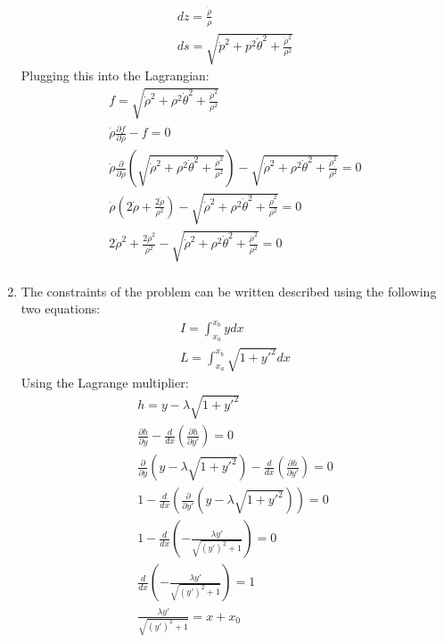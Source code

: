 \documentclass[12pt]{article}
\begin{document}
\begin{enumerate}
\begin{gather*}
            dz=\frac{\dot{\rho}}{\rho}\\
            ds=\sqrt{\dot{p}^2+p^2 \dot{\theta}^2+\frac{\dot{\rho}^2}{\rho^2}}
        \end{gather*}
        Plugging this into the Lagrangian:
        \begin{gather*}
            f=\sqrt{\dot{\rho}^2+\rho^2 \dot{\theta}^2+\frac{\dot{\rho}^2}{\rho^2}}\\
            \dot{\rho}\frac{\partial f}{\partial\dot{\rho}}-f=0\\
            \dot{\rho}\frac{\partial }{\partial\dot{\rho}}\left(\sqrt{\dot{\rho}^2+\rho^2 \dot{\theta}^2+\frac{\dot{\rho}^2}{\rho^2}}\right)-\sqrt{\dot{\rho}^2+\rho^2 \dot{\theta}^2+\frac{\dot{\rho}^2}{\rho^2}}=0\\
            \dot{\rho}\left(2\dot{\rho}+\frac{2\dot{\rho}}{\rho^2}\right)-\sqrt{\dot{\rho}^2+\rho^2 \dot{\theta}^2+\frac{\dot{\rho}^2}{\rho^2}}=0\\
            2\dot{\rho}^2+\frac{2\dot{\rho}^2}{\rho^2}-\sqrt{\dot{\rho}^2+\rho^2 \dot{\theta}^2+\frac{\dot{\rho}^2}{\rho^2}}=0\\
        \end{gather*}
        \item
        The constraints of the problem can be written described using the following two equations:
        \begin{gather*}
            I=\int_{x_a}^{x_b}ydx\\
            L=\int_{x_a}^{x_b}\sqrt{1+y'^2}dx
        \end{gather*}
        Using the Lagrange multiplier:
        \begin{gather*}
            h=y-\lambda\sqrt{1+y'^2}\\
            \frac{\partial h}{\partial y}-\frac{d}{dx}\left(\frac{\partial h}{\partial y'}\right)=0\\
            \frac{\partial}{\partial y}\left(y-\lambda\sqrt{1+y'^2}\right)-\frac{d}{dx}\left(\frac{\partial h}{\partial y'}\right)=0\\
            1-\frac{d}{dx}\left(\frac{\partial}{\partial y'}\left(y-\lambda\sqrt{1+y'^2}\right)\right)=0\\
            1-\frac{d}{dx}\left(-\frac{\lambda  y'}{\sqrt{\left(y'\right)^2+1}}\right)=0\\
            \frac{d}{dx}\left(-\frac{\lambda  y'}{\sqrt{\left(y'\right)^2+1}}\right)=1\\
            \frac{\lambda  y'}{\sqrt{\left(y'\right)^2+1}}=x+x_0\\

\end{gather*}
\end{enumerate}
\end{document}
